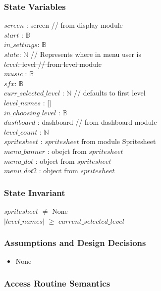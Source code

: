 \documentclass[12pt]{article}
\begin{document}
\subsubsection* {State Variables}

\sout{$screen$ : screen // from display module}\\
$start$ : $\mathbb{B}$ \\
$in\_settings$: $\mathbb{B}$ \\
$state$: $\mathbb{N}$ // Represents where in menu user is\\
\sout{$level$: level // from level module}\\
$music$ : $\mathbb{B}$ \\
$sfx$: $\mathbb{B}$ \\
$curr\_selected\_level$ : $\mathbb{N}$ // defaults to first level\\
$level\_names$ : [] \\
$in\_choosing\_level$ : $\mathbb{B}$ \\
\sout{$dashboard$ : dashboard // from dashboard module}\\
$level\_count$ : $\mathbb{N}$ \\
$spritesheet$ : $spritesheet$ from module Spritesheet \\
$menu\_banner$ : obejct from $spritesheet$ \\
$menu\_dot$ : object from $spritesheet$ \\
$menu\_dot2$ : object from $spritesheet$

\subsubsection* {State Invariant}

$spritesheet$ $\neq$ None \\
$|level\_names|$ $\geq$  $current\_selected\_level$


\subsubsection* {Assumptions and Design Decisions}

\begin{itemize}
    \item None
\end{itemize}

\subsubsection *{Access Routine Semantics}
\end{document}
